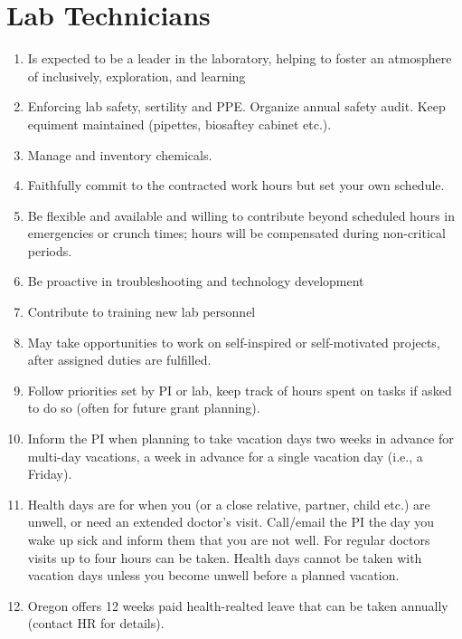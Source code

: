 \documentclass[12pt]{article}
\begin{document}
\section{Lab Technicians}
\begin{enumerate}
\item Is expected to be a leader in the laboratory, helping to foster
  an atmosphere of inclusively, exploration, and learning
\item Enforcing lab safety, sertility and PPE. Organize annual safety audit. 
\Item Keep equiment maintained (pipettes, biosaftey cabinet etc.). 
\item Manage and inventory chemicals. 
\item Faithfully commit to the contracted work hours but set your own schedule.
\item Be flexible and available and willing to contribute beyond
  scheduled hours in emergencies or crunch times; hours will be
  compensated during non-critical periods.
\item Be proactive in troubleshooting and technology development
\item Contribute to training new lab personnel
\item May take opportunities to work on self-inspired or self-motivated
  projects, after assigned duties are fulfilled.
\item Follow priorities set by PI or lab, keep track of hours spent on
  tasks if asked to do so (often for future grant planning).
\item Inform the PI when planning to take vacation days two weeks in
  advance for multi-day vacations, a week in advance for a single
  vacation day (i.e., a Friday).
\item Health days are for when you (or a close relative, partner,
  child etc.) are unwell, or need an extended doctor's
  visit. Call/email the PI the day you wake up sick and inform them
  that you are not well. For regular doctors visits up to four hours
  can be taken. Health days cannot be taken with vacation days unless
  you become unwell before a planned vacation.
  \item Oregon offers 12 weeks paid health-realted leave that can be taken annually
  (contact HR for details).
\end{enumerate}
\end{document}
